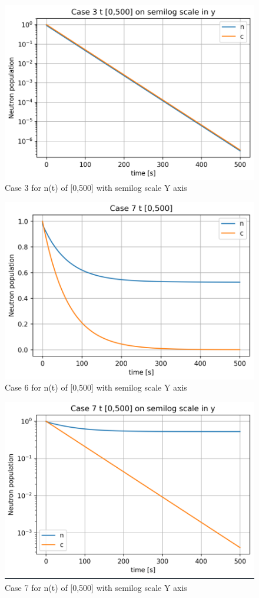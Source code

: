 \documentclass[12pt,fleqn, parskip=full]{scrartcl}
\begin{document}
\begin{figure}[H]
	\centering
	\includegraphics[scale=1]{Image_11_hw_4}
	\caption{Case 3 for n(t) of [0,500] with semilog scale Y axis}
\end{figure}

\begin{figure}[H]
	\centering
	\includegraphics[scale=1]{Image_12_hw_4}
	\caption{Case 6 for n(t) of [0,500] with semilog scale Y axis}
\end{figure}

\begin{figure}[H]
	\centering
	\includegraphics[scale=1]{Image_13_hw_4}
	\caption{Case 7 for n(t) of [0,500] with semilog scale Y axis}
\end{figure}
\end{document}
